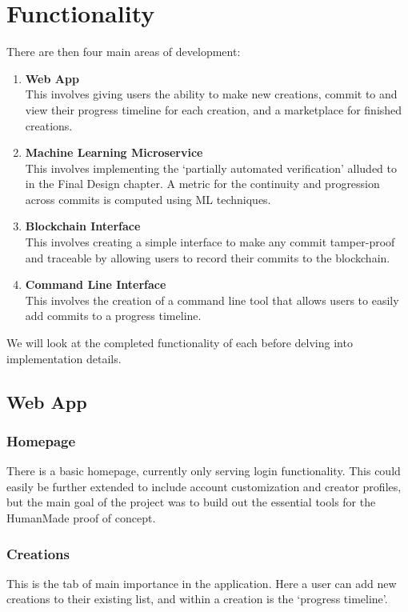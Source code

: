 \documentclass[12pt,a4paper]{article}
\begin{document}
\section{Functionality}
There are then four main areas of development:
\begin{enumerate}
    \item \textbf{Web App} \\This involves giving users the ability to make new creations, commit to and view their progress timeline for each creation, and a marketplace for finished creations.
    \item \textbf{Machine Learning Microservice} \\This involves implementing the `partially automated verification' alluded to in the Final Design chapter. A metric for the continuity and progression across commits is computed using ML techniques.
    \item \textbf{Blockchain Interface} \\This involves creating a simple interface to make any commit tamper-proof and traceable by allowing users to record their commits to the blockchain.
    \item \textbf{Command Line Interface} \\This involves the creation of a command line tool that allows users to easily add commits to a progress timeline.
\end{enumerate}
We will look at the completed functionality of each before delving into implementation details.
\subsection{Web App}
\subsubsection{Homepage}
There is a basic homepage, currently only serving login functionality. This could easily be further extended to include account customization and creator profiles, but the main goal of the project was to build out the essential tools for the HumanMade proof of concept.
\subsubsection{Creations}
This is the tab of main importance in the application. Here a user can add new creations to their existing list, and within a creation is the `progress timeline'. 
\end{document}
